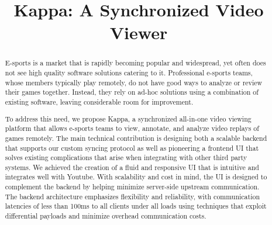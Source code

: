 \documentclass[conference]{IEEEtran}
\begin{document}
\title{Kappa: A Synchronized Video Viewer}

\author{
\and
{}
\and
{}
}



\maketitle

\begin{abstract}
  E-sports is a market that is rapidly becoming popular and widespread, yet often does not see high quality software solutions catering to it. Professional e-sports teams, whose members typically play remotely, do not have good ways to analyze or review their games together. Instead, they rely on ad-hoc solutions using a combination of existing software, leaving considerable room for improvement.

  To address this need, we propose Kappa, a synchronized all-in-one video viewing platform that allows e-sports teams to view, annotate, and analyze video replays of games remotely. The main technical contribution is designing both a scalable backend that supports our custom syncing protocol as well as pioneering a frontend UI that solves existing complications that arise when integrating with other third party systems. We achieved the creation of a fluid and responsive UI that is intuitive and integrates well with Youtube. With scalability and cost in mind, the UI is designed to complement the backend by helping minimize server-side upstream communication. The backend architecture emphasizes flexibility and reliability, with communication latencies of less than 100ms to all clients under all loads using techniques that exploit differential payloads and minimize overhead communication costs.
\end{abstract}

\IEEEpeerreviewmaketitle
\end{document}
